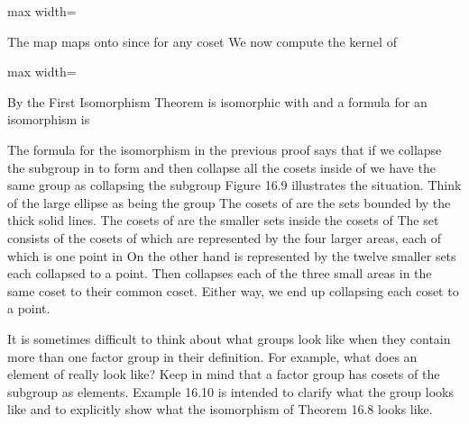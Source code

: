 \documentclass[11pt,oneside]{article}
\begin{document}
\begin{BookBody}
\begin{center}\begin{adjustbox}{max width=\linewidth}\end{adjustbox}\end{center}

\noindent The map \BookInline{\phi } maps onto  since for any coset  We now compute the kernel of 

\begin{center}\begin{adjustbox}{max width=\linewidth}\end{adjustbox}\end{center}

\noindent By the First Isomorphism Theorem  is isomorphic with  and a formula for an isomorphism  is \BookEnd{\blacklozenge}

The formula for the isomorphism in the previous proof says that if we collapse the subgroup  in  to form  and then collapse all the  cosets inside of  we have the same group as collapsing the subgroup  Figure 16.9 illustrates the situation. Think of the large ellipse as being the group  The cosets of  are the sets bounded by the thick solid lines. The cosets of  are the smaller sets inside the cosets of  The set  consists of the cosets of  which are represented by the four larger areas, each of which is one point in  On the other hand is represented by the twelve smaller sets each collapsed to a point. Then  collapses each of the three small areas in the same  coset to their common  coset. Either way, we end up collapsing each  coset to a point.

It is sometimes difficult to think about what groups look like when they contain more than one factor group in their definition. For example, what does an element of  really look like? Keep in mind that a factor group has cosets of the subgroup as elements. Example 16.10 is intended to clarify what the group  looks like and to explicitly show what the isomorphism of Theorem 16.8 looks like.

\end{BookBody}
\end{document}
